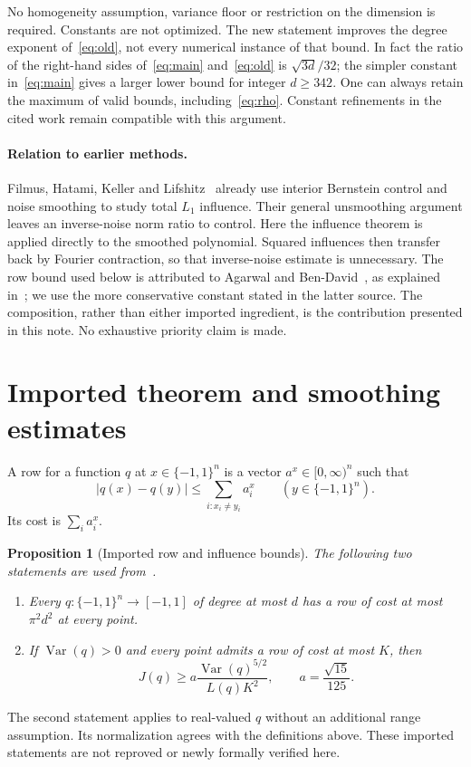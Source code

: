 \documentclass[11pt]{article}
\newtheorem{proposition}[theorem]{Proposition}
\theoremstyle{remark}\newtheorem{remark}[theorem]{Remark}
\newcommand{\Var}{\operatorname{Var}}
\newcommand{\Q}{\{-1,1\}^n}
\begin{document}
No homogeneity assumption, variance floor or restriction on the dimension is required. Constants are not optimized. The new statement improves the degree exponent of~\eqref{eq:old}, not every numerical instance of that bound. In fact the ratio of the right-hand sides of~\eqref{eq:main} and~\eqref{eq:old} is $\sqrt{3d}/32$; the simpler constant in~\eqref{eq:main} gives a larger lower bound for integer $d\ge342$. One can always retain the maximum of valid bounds, including~\eqref{eq:rho}. Constant refinements in the cited work remain compatible with this argument.

\paragraph{Relation to earlier methods.}
Filmus, Hatami, Keller and Lifshitz~\cite[Proposition 3.2 and Section 5.1]{FHKL} already use interior Bernstein control and noise smoothing to study total $L_1$ influence. Their general unsmoothing argument leaves an inverse-noise norm ratio to control. Here the influence theorem is applied directly to the smoothed polynomial. Squared influences then transfer back by Fourier contraction, so that inverse-noise estimate is unnecessary. The row bound used below is attributed to Agarwal and Ben-David~\cite[Theorem 1.7]{ABD}, as explained in~\cite[Section 6]{T}; we use the more conservative constant stated in the latter source. The composition, rather than either imported ingredient, is the contribution presented in this note. No exhaustive priority claim is made.

\section{Imported theorem and smoothing estimates}
A row for a function $q$ at $x\in\Q$ is a vector $a^x\in[0,\infty)^n$ such that
\begin{equation}\label{eq:row}
 |q(x)-q(y)|\le\sum_{i:x_i\ne y_i}a_i^x\qquad(y\in\Q).
\end{equation}
Its cost is $\sum_i a_i^x$.

\begin{proposition}[Imported row and influence bounds]\label{prop:import}
The following two statements are used from~\cite[Sections 6 and 8]{T}.
\begin{enumerate}
\item Every $q:\Q\to[-1,1]$ of degree at most $d$ has a row of cost at most $\pi^2d^2$ at every point.
\item If $\Var(q)>0$ and every point admits a row of cost at most $K$, then
\begin{equation}\label{eq:import}
 J(q)\ge a\frac{\Var(q)^{5/2}}{L(q)K^2},\qquad a=\frac{\sqrt{15}}{125}.
\end{equation}
\end{enumerate}
\end{proposition}
The second statement applies to real-valued $q$ without an additional range assumption. Its normalization agrees with the definitions above. These imported statements are not reproved or newly formally verified here.
\end{document}
